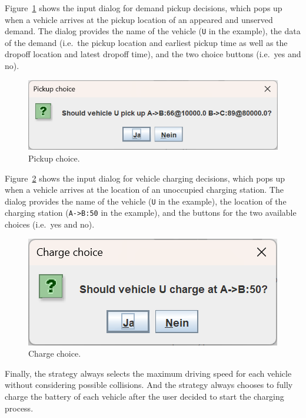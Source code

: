 \documentclass[10pt,twocolumn]{article}
\begin{document}
Figure~\ref{fig:manual-controller-demand} shows the input dialog for demand pickup decisions, which pops up when a vehicle arrives at the pickup location of an appeared and unserved demand.
The dialog provides the name of the vehicle (\texttt{U} in the example), the data of the demand (i.e.\ the pickup location and earliest pickup time as well as the dropoff location and latest dropoff time), and the two choice buttons (i.e.\ yes and no).

\begin{figure}[!ht]
    \centering
    \includegraphics[scale=0.4]{../../screenshots/manual-controller-demand.png}
    \caption{Pickup choice.}
    \label{fig:manual-controller-demand}
\end{figure}

Figure~\ref{fig:manual-controller-charge} shows the input dialog for vehicle charging decisions, which pops up when a vehicle arrives at the location of an unoccupied charging station.
The dialog provides the name of the vehicle (\texttt{U} in the example), the location of the charging station (\texttt{A->B:50} in the example), and the buttons for the two available choices (i.e.\ yes and no).

\begin{figure}[!ht]
    \centering
    \includegraphics[scale=0.4]{../../screenshots/manual-controller-charge.png}
    \caption{Charge choice.}
    \label{fig:manual-controller-charge}
\end{figure}

Finally, the strategy always selects the maximum driving speed for each vehicle without considering possible collisions.
And the strategy always chooses to fully charge the battery of each vehicle after the user decided to start the charging process.
\end{document}
